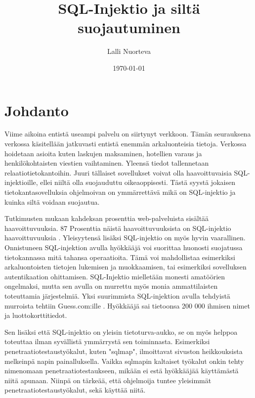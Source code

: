 \documentclass[finnish]{tktltiki2}
\title{SQL-Injektio ja siltä suojautuminen}
\author{Lalli Nuorteva}
\date{\today}
\theoremstyle{definition}
\theoremstyle{remark}
\begin{document}
	
	\frontmatter      %
	
	\maketitle        %
	
	\makeabstract
	
	\tableofcontents  %
	
	
	\mainmatter       %
	
	\section{Johdanto}
	Viime aikoina entistä useampi palvelu on siirtynyt verkkoon. Tämän seurauksena verkossa käsitellään jatkuvasti entistä enemmän arkaluonteisia tietoja. Verkossa hoidetaan asioita kuten laskujen maksaminen, hotellien varaus ja henkilökohtaisten viestien vaihtaminen. Yleensä tiedot tallennetaan relaatiotietokantoihin. Juuri tällaiset sovellukset voivat olla haavoittuvaisia SQL-injektioille, ellei niiltä olla suojauduttu oikeaoppisesti. Tästä syystä jokaisen tietokantasovelluksia ohjelmoivan on ymmärrettävä mikä on SQL-injektio ja kuinka siltä voidaan suojautua.
	
	Tutkimusten mukaan kahdeksan prosenttia web-palveluista sisältää haavoittuvuuksia.  87 Prosenttia näistä haavoittuvuuksista on SQL-injektio haavoittuvuuksia \cite{detection}. Yleisyytensä lisäksi SQL-injektio on myös hyvin vaarallinen. Onnistuneen SQL-injektion avulla hyökkääjä voi suorittaa huonosti suojatussa tietokannassa mitä tahansa operaatioita. Tämä voi mahdollistaa esimerkiksi arkaluontoisten tietojen lukemisen ja muokkaamisen, tai esimerkiksi sovelluksen autentikaation ohittamisen. SQL-Injektio mielletään monesti amatöörien ongelmaksi, mutta sen avulla on murrettu myös monia ammattilaisten toteuttamia järjestelmiä. Yksi suurimmista SQL-injektion avulla tehdyistä murroista tehtiin Guess.com:ille \cite{guess}. Hyökkääjä sai tietoonsa 200 000 ihmisen nimet ja luottokorttitiedot.
	
	Sen lisäksi että SQL-injektio on yleisin tietoturva-aukko, se on myös helppoa toteuttaa ilman syvällistä ymmärrystä sen toiminnasta. Esimerkiksi penetraatiotestaustyökalut, kuten "sqlmap"\space, ilmoittavat sivuston heikkouksista melkeinpä napin painalluksella. Vaikka sqlmapin kaltaiset työkalut onkin tehty nimenomaan penetraatiotestaukseen, mikään ei estä hyökkääjää käyttämästä niitä apunaan. Niinpä on tärkeää, että ohjelmoija tuntee yleisimmät penetraatiotestaustyökalut, sekä käyttää niitä.
	
\end{document}
